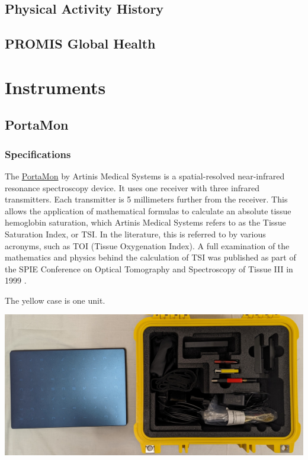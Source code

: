 \documentclass[
]{book}
\begin{document}
\hypertarget{Appendix-Surveys-pah}{%
\section{Physical Activity History}\label{Appendix-Surveys-pah}}

\hypertarget{Appendix-Surveys-promis}{%
\section{PROMIS Global Health}\label{Appendix-Surveys-promis}}

\hypertarget{Appendix-Instruments}{%
\chapter{Instruments}\label{Appendix-Instruments}}

\hypertarget{Appendix-Instruments-PortaMon}{%
\section{PortaMon}\label{Appendix-Instruments-PortaMon}}

\hypertarget{Appendix-Instruments-PortaMon-Specs}{%
\subsection{Specifications}\label{Appendix-Instruments-PortaMon-Specs}}

The \href{https://www.artinis.com/portamon}{PortaMon} by Artinis Medical Systems is a spatial-resolved near-infrared resonance spectroscopy device. It uses one receiver with three infrared transmitters. Each transmitter is 5 millimeters further from the receiver. This allows the application of mathematical formulas to calculate an absolute tissue hemoglobin saturation, which Artinis Medical Systems refers to as the Tissue Saturation Index, or TSI. In the literature, this is referred to by various acronyms, such as TOI (Tissue Oxygenation Index). A full examination of the mathematics and physics behind the calculation of TSI was published as part of the SPIE Conference on Optical Tomography and Spectroscopy of Tissue III in 1999 \citep{Suzuki1999TissueOM}.

The yellow case is one unit.

\includegraphics[width=1\linewidth]{images/portamoncase}
\end{document}

